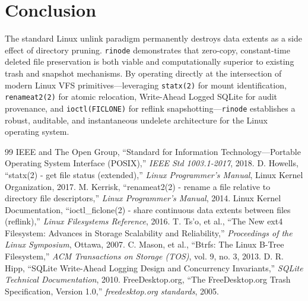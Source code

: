 \documentclass[11pt,a4paper]{article}
\begin{document}
\section{Conclusion}
The standard Linux unlink paradigm permanently destroys data extents as a side effect of directory pruning. \texttt{rinode} demonstrates that zero-copy, constant-time deleted file preservation is both viable and computationally superior to existing trash and snapshot mechanisms. By operating directly at the intersection of modern Linux VFS primitives—leveraging \texttt{statx(2)} for mount identification, \texttt{renameat2(2)} for atomic relocation, Write-Ahead Logged SQLite for audit provenance, and \texttt{ioctl(FICLONE)} for reflink snapshotting—\texttt{rinode} establishes a robust, auditable, and instantaneous undelete architecture for the Linux operating system.

\begin{thebibliography}{99}
 IEEE and The Open Group, ``Standard for Information Technology---Portable Operating System Interface (POSIX),'' \textit{IEEE Std 1003.1-2017}, 2018.
 D. Howells, ``statx(2) - get file status (extended),'' \textit{Linux Programmer's Manual}, Linux Kernel Organization, 2017.
 M. Kerrisk, ``renameat2(2) - rename a file relative to directory file descriptors,'' \textit{Linux Programmer's Manual}, 2014.
 Linux Kernel Documentation, ``ioctl\_ficlone(2) - share continuous data extents between files (reflink),'' \textit{Linux Filesystems Reference}, 2016.
 T. Ts'o, et al., ``The New ext4 Filesystem: Advances in Storage Scalability and Reliability,'' \textit{Proceedings of the Linux Symposium}, Ottawa, 2007.
 C. Mason, et al., ``Btrfs: The Linux B-Tree Filesystem,'' \textit{ACM Transactions on Storage (TOS)}, vol. 9, no. 3, 2013.
 D. R. Hipp, ``SQLite Write-Ahead Logging Design and Concurrency Invariants,'' \textit{SQLite Technical Documentation}, 2010.
 FreeDesktop.org, ``The FreeDesktop.org Trash Specification, Version 1.0,'' \textit{freedesktop.org standards}, 2005.
\end{thebibliography}
\end{document}
